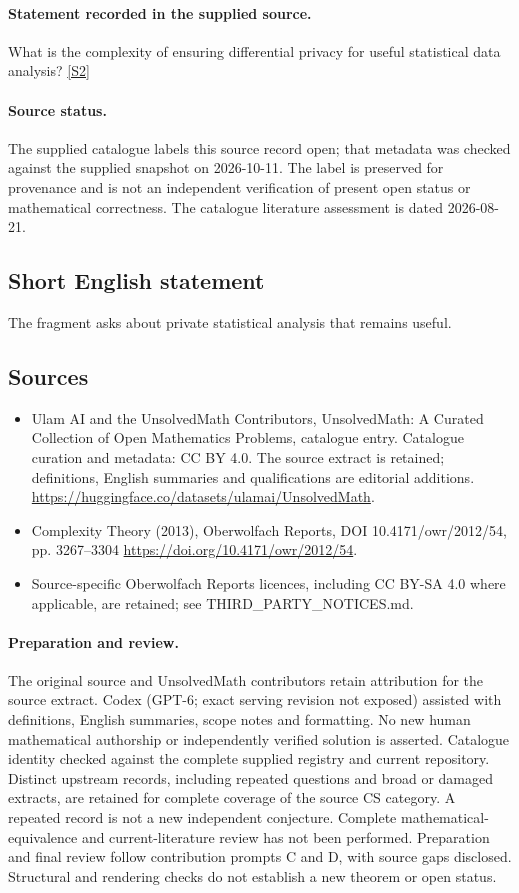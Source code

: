 \documentclass[11pt]{article}
\newcommand{\sref}[2]{\hyperlink{source:#1:#2}{[S#2]}}
\begin{document}
\paragraph{Statement recorded in the supplied source.}
What is the complexity of ensuring differential privacy for useful statistical data analysis? \sref{statement}{2}
\paragraph{Source status.}
The supplied catalogue labels this source record open; that metadata was checked against the supplied snapshot on 2026-10-11. The label is preserved for provenance and is not an independent verification of present open status or mathematical correctness. The catalogue literature assessment is dated 2026-08-21.
\subsection{Short English statement}
The fragment asks about private statistical analysis that remains useful.
\subsection{Sources}
\begin{itemize}
\item[\hypertarget{source:statement:1}{S1}] Ulam AI and the UnsolvedMath Contributors, UnsolvedMath: A Curated Collection of Open Mathematics Problems, catalogue entry. Catalogue curation and metadata: CC BY 4.0. The source extract is retained; definitions, English summaries and qualifications are editorial additions.
\url{https://huggingface.co/datasets/ulamai/UnsolvedMath}.
\item[\hypertarget{source:statement:2}{S2}] Complexity Theory (2013), Oberwolfach Reports, DOI 10.4171/owr/2012/54, pp. 3267--3304
\url{https://doi.org/10.4171/owr/2012/54}.
\item Source-specific Oberwolfach Reports licences, including CC BY-SA 4.0 where applicable, are retained; see THIRD\_PARTY\_NOTICES.md.
\end{itemize}
\paragraph{Preparation and review.}
The original source and UnsolvedMath contributors retain attribution for the source extract. Codex (GPT-6; exact serving revision not exposed) assisted with definitions, English summaries, scope notes and formatting. No new human mathematical authorship or independently verified solution is asserted. Catalogue identity checked against the complete supplied registry and current repository. Distinct upstream records, including repeated questions and broad or damaged extracts, are retained for complete coverage of the source CS category. A repeated record is not a new independent conjecture. Complete mathematical-equivalence and current-literature review has not been performed. Preparation and final review follow contribution prompts C and D, with source gaps disclosed. Structural and rendering checks do not establish a new theorem or open status.
\label{end:statement}
\end{document}
